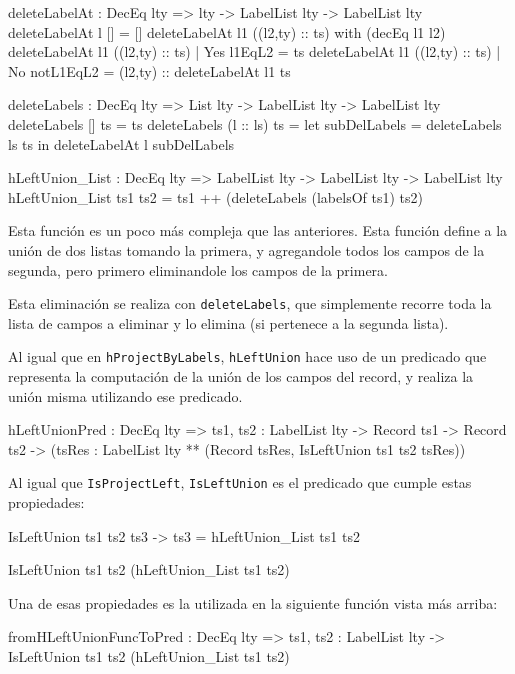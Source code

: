 \begin{code}
deleteLabelAt : DecEq lty => lty -> LabelList lty -> 
  LabelList lty
deleteLabelAt l [] = []
deleteLabelAt l1 ((l2,ty) :: ts) with (decEq l1 l2)
  deleteLabelAt l1 ((l2,ty) :: ts) | Yes l1EqL2 = ts
  deleteLabelAt l1 ((l2,ty) :: ts) | No notL1EqL2 = 
    (l2,ty) :: deleteLabelAt l1 ts

deleteLabels : DecEq lty => List lty -> LabelList lty -> 
  LabelList lty
deleteLabels [] ts = ts
deleteLabels (l :: ls) ts = 
  let subDelLabels = deleteLabels ls ts
  in deleteLabelAt l subDelLabels

hLeftUnion_List : DecEq lty => LabelList lty -> 
  LabelList lty -> LabelList lty
hLeftUnion_List ts1 ts2 = 
  ts1 ++ (deleteLabels (labelsOf ts1) ts2)
\end{code}

Esta función es un poco más compleja que las anteriores. Esta función define a la unión de dos listas tomando la primera, y agregandole todos los campos de la segunda, pero primero eliminandole los campos de la primera.

Esta eliminación se realiza con \texttt{deleteLabels}, que simplemente recorre toda la lista de campos a eliminar y lo elimina (si pertenece a la segunda lista).

Al igual que en \texttt{hProjectByLabels}, \texttt{hLeftUnion} hace uso de un predicado que representa la computación de la unión de los campos del record, y realiza la unión misma utilizando ese predicado.

\begin{code}
hLeftUnionPred : DecEq lty => {ts1, ts2 : LabelList lty} -> 
  Record ts1 -> Record ts2 ->
  (tsRes : LabelList lty ** (Record tsRes, 
    IsLeftUnion ts1 ts2 tsRes))
\end{code}

Al igual que \texttt{IsProjectLeft}, \texttt{IsLeftUnion} es el predicado que cumple estas propiedades:

\begin{code}
IsLeftUnion ts1 ts2 ts3 -> ts3 = hLeftUnion_List ts1 ts2

IsLeftUnion ts1 ts2 (hLeftUnion_List ts1 ts2)
\end{code}

Una de esas propiedades es la utilizada en la siguiente función vista más arriba:

\begin{code}
fromHLeftUnionFuncToPred : DecEq lty => 
  {ts1, ts2 : LabelList lty} -> 
  IsLeftUnion ts1 ts2 (hLeftUnion_List ts1 ts2)  
\end{code}

